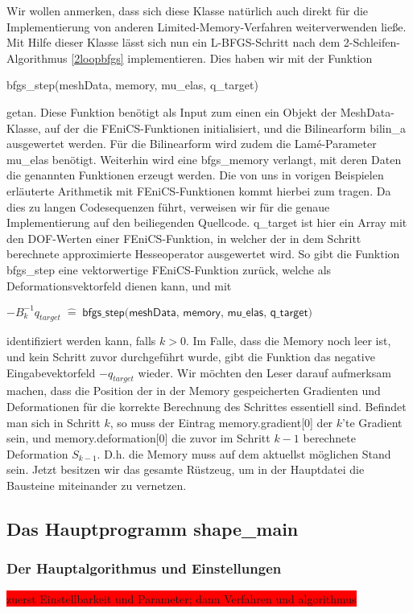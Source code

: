 Wir wollen anmerken, dass sich diese Klasse natürlich auch direkt für die Implementierung von anderen Limited-Memory-Verfahren weiterverwenden ließe. 
Mit Hilfe dieser Klasse lässt sich nun ein L-BFGS-Schritt nach dem 2-Schleifen-Algorithmus \ref{2loopbfgs} implementieren. Dies haben wir mit der Funktion 
\begin{center}
\textsf{bfgs\_step(meshData, memory, mu\_elas, q\_target)}
\end{center} 
getan. Diese Funktion benötigt als Input zum einen ein Objekt der  \textsf{MeshData}-Klasse, auf der die FEniCS-Funktionen initialisiert, und die Bilinearform \textsf{bilin\_a} ausgewertet werden. Für die Bilinearform wird zudem die Lamé-Parameter \textsf{mu\_elas} benötigt. Weiterhin wird eine \textsf{bfgs\_memory} verlangt, mit deren Daten die genannten Funktionen erzeugt werden. Die von uns in vorigen Beispielen erläuterte Arithmetik mit FEniCS-Funktionen kommt hierbei zum tragen. Da dies zu langen Codesequenzen führt, verweisen wir für die genaue Implementierung auf den beiliegenden Quellcode. \textsf{q\_target} ist hier ein Array mit den DOF-Werten einer FEniCS-Funktion, in welcher der in dem Schritt berechnete approximierte Hesseoperator ausgewertet wird. So gibt die Funktion \textsf{bfgs\_step} eine vektorwertige FEniCS-Funktion zurück, welche als Deformationsvektorfeld dienen kann, und mit
\begin{center}
$-B_k^{-1} q_{target} \; \hat{=} \; \textsf{bfgs\_step(meshData, memory, mu\_elas, q\_target)}$
\end{center}
identifiziert werden kann, falls $k>0$. Im Falle, dass die Memory noch leer ist, und kein Schritt zuvor durchgeführt wurde, gibt die Funktion das negative Eingabevektorfeld \textsf{$-q_{target}$} wieder. Wir möchten den Leser darauf aufmerksam machen, dass die Position der in der Memory gespeicherten Gradienten und Deformationen für die korrekte Berechnung des Schrittes essentiell sind. Befindet man sich in Schritt $k$, so muss der Eintrag \textsf{memory.gradient[0]} der $k$'te Gradient sein, und \textsf{memory.deformation[0]} die zuvor im Schritt $k-1$ berechnete Deformation $S_{k-1}$. D.h. die Memory muss auf dem aktuellst möglichen Stand sein. Jetzt besitzen wir das gesamte Rüstzeug, um in der Hauptdatei die Bausteine miteinander zu vernetzen.

\subsection{Das Hauptprogramm shape\_main}
\subsubsection{Der Hauptalgorithmus und Einstellungen}
\colorbox{red}{zuerst Einstellbarkeit und Parameter; dann Verfahren und algorithmus}

